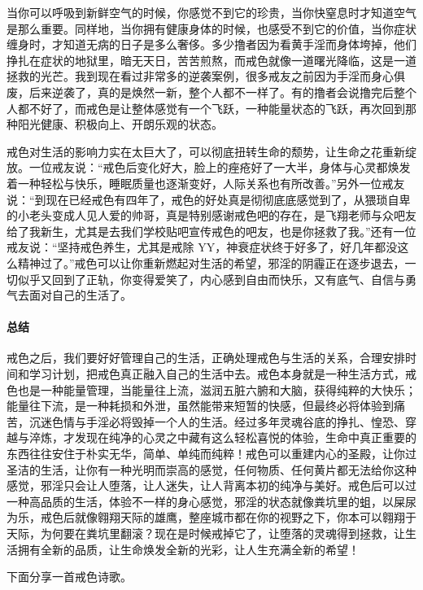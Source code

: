 当你可以呼吸到新鲜空气的时候，你感觉不到它的珍贵，当你快窒息时才知道空气是那么重要。同样地，当你拥有健康身体的时候，也感受不到它的价值，当你症状缠身时，才知道无病的日子是多么奢侈。多少撸者因为看黄手淫而身体垮掉，他们挣扎在症状的地狱里，暗无天日，苦苦煎熬，而戒色就像一道曙光降临，这是一道拯救的光芒。我到现在看过非常多的逆袭案例，很多戒友之前因为手淫而身心俱废，后来逆袭了，真的是焕然一新，整个人都不一样了。有的撸者会说撸完后整个人都不好了，而戒色是让整体感觉有一个飞跃，一种能量状态的飞跃，再次回到那种阳光健康、积极向上、开朗乐观的状态。

戒色对生活的影响力实在太巨大了，可以彻底扭转生命的颓势，让生命之花重新绽放。一位戒友说：“戒色后变化好大，脸上的痤疮好了一大半，身体与心灵都焕发着一种轻松与快乐，睡眠质量也逐渐变好，人际关系也有所改善。”另外一位戒友说：“到现在已经戒色有四年了，戒色的好处真是彻彻底底感觉到了，从猥琐自卑的小老头变成人见人爱的帅哥，真是特别感谢戒色吧的存在，是飞翔老师与众吧友给了我新生，尤其是去我们学校贴吧宣传戒色的吧友，也是你拯救了我。”还有一位戒友说：“坚持戒色养生，尤其是戒除 YY，神衰症状终于好多了，好几年都没这么精神过了。”戒色可以让你重新燃起对生活的希望，邪淫的阴霾正在逐步退去，一切似乎又回到了正轨，你变得爱笑了，内心感到自由而快乐，又有底气、自信与勇气去面对自己的生活了。

\paragraph{总结}

戒色之后，我们要好好管理自己的生活，正确处理戒色与生活的关系，合理安排时间和学习计划，把戒色真正融入自己的生活中去。戒色本身就是一种生活方式，戒色也是一种能量管理，当能量往上流，滋润五脏六腑和大脑，获得纯粹的大快乐；能量往下流，是一种耗损和外泄，虽然能带来短暂的快感，但最终必将体验到痛苦，沉迷色情与手淫必将毁掉一个人的生活。经过多年灵魂谷底的挣扎、惶恐、穿越与淬炼，才发现在纯净的心灵之中藏有这么轻松喜悦的体验，生命中真正重要的东西往往安住于朴实无华，简单、单纯而纯粹！戒色可以重建内心的圣殿，让你过圣洁的生活，让你有一种光明而崇高的感觉，任何物质、任何黄片都无法给你这种感觉，邪淫只会让人堕落，让人迷失，让人背离本初的纯净与美好。戒色后可以过一种高品质的生活，体验不一样的身心感觉，邪淫的状态就像粪坑里的蛆，以屎尿为乐，戒色后就像翱翔天际的雄鹰，整座城市都在你的视野之下，你本可以翱翔于天际，为何要在粪坑里翻滚？现在是时候戒掉它了，让堕落的灵魂得到拯救，让生活拥有全新的品质，让生命焕发全新的光彩，让人生充满全新的希望！

下面分享一首戒色诗歌。


